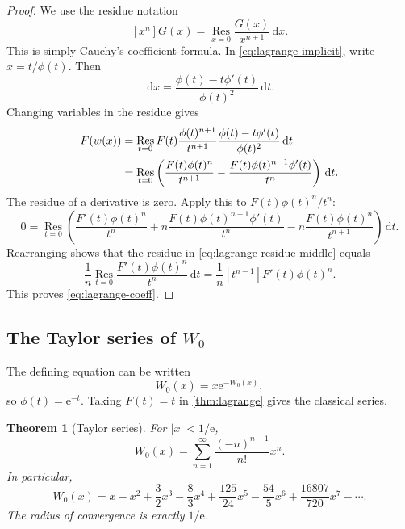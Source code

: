 \documentclass[11pt]{article}
\numberwithin{equation}{section}
\newtheorem{theorem}{Theorem}[section]
\theoremstyle{definition}
\theoremstyle{remark}
\newcommand{\e}{\mathrm e}
\newcommand{\dd}{\,\mathrm d}
\newcommand{\Res}{\operatorname*{Res}}
\begin{document}
\begin{proof}
We use the residue notation
\[
  [x^n]G(x)=\Res_{x=0}\frac{G(x)}{x^{n+1}}\dd x.
\]
This is simply Cauchy's coefficient formula.  In
\eqref{eq:lagrange-implicit}, write $x=t/\phi(t)$.  Then
\[
  \dd x=\frac{\phi(t)-t\phi'(t)}{\phi(t)^2}\dd t.
\]
Changing variables in the residue gives
\begin{align}
[x^n]F(w(x))
 &=\Res_{t=0}F(t)
   \frac{\phi(t)^{n+1}}{t^{n+1}}
   \frac{\phi(t)-t\phi'(t)}{\phi(t)^2}\dd t \notag\\
 &=\Res_{t=0}\left(
   \frac{F(t)\phi(t)^n}{t^{n+1}}
  -\frac{F(t)\phi(t)^{n-1}\phi'(t)}{t^n}\right)\dd t.
                                                               \label{eq:lagrange-residue-middle}
\end{align}
The residue of a derivative is zero.  Apply this to
$F(t)\phi(t)^n/t^n$:
\[
0=\Res_{t=0}\left(
 \frac{F'(t)\phi(t)^n}{t^n}
 +n\frac{F(t)\phi(t)^{n-1}\phi'(t)}{t^n}
 -n\frac{F(t)\phi(t)^n}{t^{n+1}}
 \right)\dd t.
\]
Rearranging shows that the residue in
\eqref{eq:lagrange-residue-middle} equals
\[
  \frac1n\Res_{t=0}\frac{F'(t)\phi(t)^n}{t^n}\dd t
  =\frac1n[t^{n-1}]F'(t)\phi(t)^n.
\]
This proves \eqref{eq:lagrange-coeff}.
\end{proof}

\subsection{The Taylor series of \texorpdfstring{$W_0$}{W0}}

The defining equation can be written
\begin{equation}
  W_0(x)=x\e^{-W_0(x)},                                \label{eq:W-lagrange-form}
\end{equation}
so $\phi(t)=\e^{-t}$.  Taking $F(t)=t$ in
\cref{thm:lagrange} gives the classical series.

\begin{theorem}[Taylor series]
\label{thm:W-taylor}
For $|x|<1/\e$,
\begin{equation}
  W_0(x)=\sum_{n=1}^{\infty}
     \frac{(-n)^{n-1}}{n!}x^n.                        \label{eq:W-taylor}
\end{equation}
In particular,
\begin{equation}
 W_0(x)=x-x^2+\frac32x^3-\frac83x^4
       +\frac{125}{24}x^5-\frac{54}{5}x^6
       +\frac{16807}{720}x^7-\cdots.                  \label{eq:W-taylor-first}
\end{equation}
The radius of convergence is exactly $1/\e$.
\end{theorem}
\end{document}
